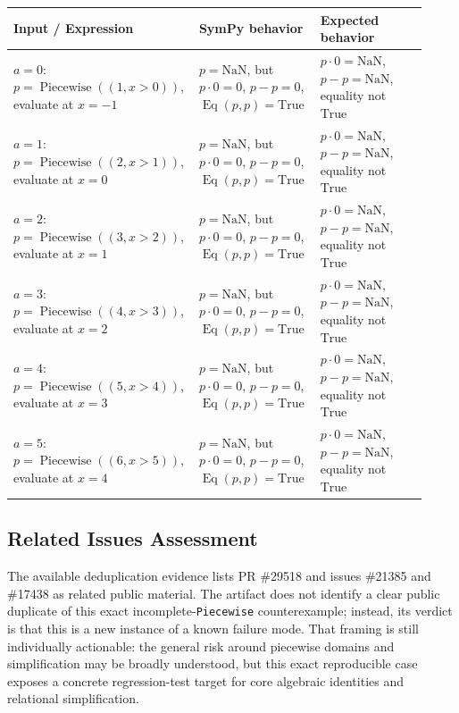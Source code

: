 \documentclass[11pt]{article}
\begin{document}
\begin{center}
\small
\renewcommand{\arraystretch}{1.3}
\begin{tabular}{@{}>{\raggedright\arraybackslash}p{0.42\linewidth}>{\raggedright\arraybackslash}p{0.25\linewidth}>{\raggedright\arraybackslash}p{0.25\linewidth}@{}}
\toprule
\textbf{Input / Expression} & \textbf{SymPy behavior} & \textbf{Expected behavior} \\
\midrule
\(a=0\): \(p=\operatorname{Piecewise}((1,x>0))\), evaluate at \(x=-1\) &
\(p=\mathrm{NaN}\), but \(p\cdot0=0\), \(p-p=0\), \(\operatorname{Eq}(p,p)=\mathrm{True}\) &
\(p\cdot0=\mathrm{NaN}\), \(p-p=\mathrm{NaN}\), equality not \(\mathrm{True}\) \\
\(a=1\): \(p=\operatorname{Piecewise}((2,x>1))\), evaluate at \(x=0\) &
\(p=\mathrm{NaN}\), but \(p\cdot0=0\), \(p-p=0\), \(\operatorname{Eq}(p,p)=\mathrm{True}\) &
\(p\cdot0=\mathrm{NaN}\), \(p-p=\mathrm{NaN}\), equality not \(\mathrm{True}\) \\
\(a=2\): \(p=\operatorname{Piecewise}((3,x>2))\), evaluate at \(x=1\) &
\(p=\mathrm{NaN}\), but \(p\cdot0=0\), \(p-p=0\), \(\operatorname{Eq}(p,p)=\mathrm{True}\) &
\(p\cdot0=\mathrm{NaN}\), \(p-p=\mathrm{NaN}\), equality not \(\mathrm{True}\) \\
\(a=3\): \(p=\operatorname{Piecewise}((4,x>3))\), evaluate at \(x=2\) &
\(p=\mathrm{NaN}\), but \(p\cdot0=0\), \(p-p=0\), \(\operatorname{Eq}(p,p)=\mathrm{True}\) &
\(p\cdot0=\mathrm{NaN}\), \(p-p=\mathrm{NaN}\), equality not \(\mathrm{True}\) \\
\(a=4\): \(p=\operatorname{Piecewise}((5,x>4))\), evaluate at \(x=3\) &
\(p=\mathrm{NaN}\), but \(p\cdot0=0\), \(p-p=0\), \(\operatorname{Eq}(p,p)=\mathrm{True}\) &
\(p\cdot0=\mathrm{NaN}\), \(p-p=\mathrm{NaN}\), equality not \(\mathrm{True}\) \\
\(a=5\): \(p=\operatorname{Piecewise}((6,x>5))\), evaluate at \(x=4\) &
\(p=\mathrm{NaN}\), but \(p\cdot0=0\), \(p-p=0\), \(\operatorname{Eq}(p,p)=\mathrm{True}\) &
\(p\cdot0=\mathrm{NaN}\), \(p-p=\mathrm{NaN}\), equality not \(\mathrm{True}\) \\
\bottomrule
\end{tabular}
\end{center}

\subsection{Related Issues Assessment}

The available deduplication evidence lists PR \#29518 and issues \#21385 and
\#17438 as related public material.  The artifact does not identify a clear
public duplicate of this exact incomplete-\texttt{Piecewise} counterexample;
instead, its verdict is that this is a new instance of a known failure mode.
That framing is still individually actionable: the general risk around
piecewise domains and simplification may be broadly understood, but this exact
reproducible case exposes a concrete regression-test target for core algebraic
identities and relational simplification.
\end{document}
